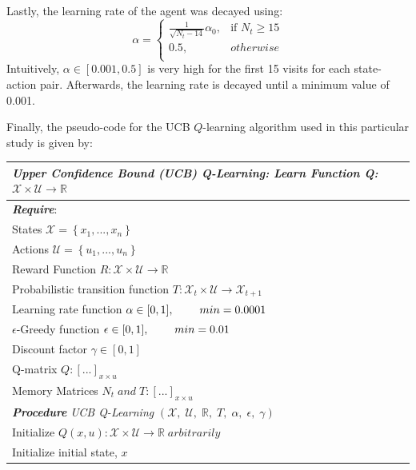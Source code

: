 Lastly, the learning rate of the agent was decayed using:
\[
    \alpha =
\begin{cases}
    \frac{1}{\sqrt{N_t - 14}}\alpha_0,              & \text{if } N_t  \geq 15 \\
    0.5,              & otherwise \\
\end{cases}
\]
Intuitively, $\alpha \in [0.001, 0.5]$ is very high for the first 15 visits for each state-action pair.  Afterwards, the learning rate is decayed until a minimum value of 0.001.

Finally, the pseudo-code for the UCB $Q$-learning algorithm used in this particular study is given by:
\begin{table}[h]
	\def\arraystretch{1.2}
	\begin{tabular}{p{14cm}}
	\hline
	\emph{Upper Confidence Bound (UCB) Q-Learning: Learn Function Q: $\mathcal{X} \times \mathcal{U} \rightarrow \mathbb{R}$} \\ \hline
	\textbf{\emph{Require}}: \\
		States $\mathcal{X} = \left\{ x_1, ..., x_n \right\}$ \\
		Actions $\mathcal{U} = \left\{u_1, ..., u_n \right\}$ \\
		Reward Function $R: \mathcal{X} \times \mathcal{U} \rightarrow \mathbb{R}$ \\
		Probabilistic transition function $T: \mathcal{X}_t \times \mathcal{U} \rightarrow \mathcal{X}_{t+1}$ \\
		Learning rate function $\alpha \in [0, 1], \hspace{0.8cm} min = 0.0001$ \\
		$\epsilon$-Greedy function $\epsilon \in [0, 1], \hspace{0.8cm} min = 0.01$ \\
		Discount factor $\gamma \in [0, 1]$ \\
		Q-matrix $Q:[...]_{x \times u}$ \\
		Memory Matrices $N_t \; and \; T : [...]_{x \times u}$ \\
		\textbf{\emph{Procedure}} \emph{UCB Q-Learning} $(\mathcal{X},\; \mathcal{U},\; \mathbb{R},\; T,\; \alpha,\; \epsilon,\; \gamma)$ \\
		\hspace{1cm}  Initialize $Q(x, u): \mathcal{X} \times \mathcal{U} \rightarrow \mathbb{R} \; arbitrarily$ \\
		\hspace{1cm} Initialize initial state, $x$ \\

\end{tabular}
\end{table}
